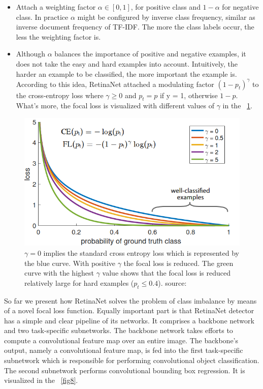 \documentclass[runningheads]{llncs}
\begin{document}
\begin{itemize}
	\item Attach a weighting factor $\alpha \in [0,1]$, for positive class and $1 - \alpha$ for negative class. In practice $\alpha$ might be configured by inverse class frequency, similar as inverse document frequency of TF-IDF. The more the class labels occur, the less the weighting factor is.
	\item Although $\alpha$ balances the importance of positive and negative examples, it does not take the easy and hard examples into account. Intuitively, the harder an example to be classified, the more important the example is. According to this idea, RetinaNet attached a modulating factor $(1-p_t)^\gamma$ to the cross-entropy loss where $\gamma \geq 0$ and $p_t = p$ if y = 1, otherwise $1-p$. What’s more, the focal loss is visualized with different values of $\gamma$ in the ~\ref{fig7}.
\end{itemize}

\begin{figure}
\includegraphics[width=\textwidth]{figs/loss_with_gammas.png}
\caption{$\gamma = 0$ implies the standard cross entropy loss which is represented by the blue curve. With positive $\gamma$ the focal loss is reduced. The green curve with the highest $\gamma$ value shows that the focal loss is reduced relatively large for hard examples ($p_t \leq 0.4$). source: ~\cite{ref_retinanet}} \label{fig7}
\end{figure}

So far we present how RetinaNet solves the problem of class imbalance by means of a novel focal loss function. Equally important part is that RetinaNet detector has a simple and clear pipeline of its networks. It comprises a backbone network and two task-specific subnetworks. The backbone network takes efforts to compute a convolutional feature map over an entire image. The backbone’s output, namely a convolutional feature map, is fed into the first task-specific subnetwork which is responsible for performing convolutional object classification. The second subnetwork performs convolutional bounding box regression. It is visualized in the ~\ref{fig8}.
\end{document}
